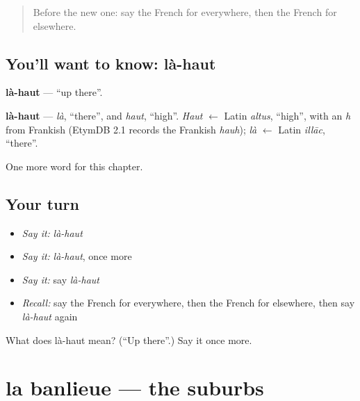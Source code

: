 \label{lesson:FR-C216-la-haut}



\begin{quote}
Before the new one: say the French for everywhere, then the French for elsewhere.
\end{quote}

\subsection*{You'll want to know: là-haut}
\textbf{là-haut} — \textquotedblleft{}up there\textquotedblright{}.

\begin{cousinweb}
\textbf{là-haut} — \emph{là}, \textquotedblleft{}there\textquotedblright{}, and \emph{haut}, \textquotedblleft{}high\textquotedblright{}. \emph{Haut} $\leftarrow$ Latin \emph{altus}, \textquotedblleft{}high\textquotedblright{}, with an \emph{h} from Frankish (EtymDB 2.1 records the Frankish \emph{hauh}); \emph{là} $\leftarrow$ Latin \emph{illāc}, \textquotedblleft{}there\textquotedblright{}.
\end{cousinweb}

\begin{grammarlens}[title={What you've built}]
One more word for this chapter.
\end{grammarlens}

\subsection*{Your turn}
\begin{itemize}
\raggedright
  \item \emph{Say it:} \emph{là-haut}
  \item \emph{Say it:} \emph{là-haut}, once more
  \item \emph{Say it:} say \emph{là-haut}
  \item \emph{Recall:} say the French for everywhere, then the French for elsewhere, then say \emph{là-haut} again
\end{itemize}

\begin{tcolorbox}[breakable,colback=teal!4,colframe=teal!35!black,title={Before you move on}]
What does là-haut mean? (\textquotedblleft{}Up there\textquotedblright{}.) Say it once more.
\end{tcolorbox}
\section[la banlieue]{la banlieue — the suburbs}

